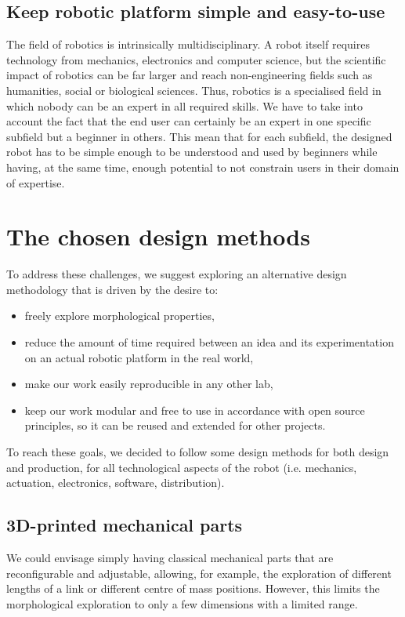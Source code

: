 \subsection{Keep robotic platform simple and easy-to-use} %

The field of robotics is intrinsically multidisciplinary. A robot itself requires technology from mechanics, electronics and computer science, but the scientific impact of robotics can be far larger and reach non-engineering fields such as humanities, social or biological sciences. Thus, robotics is a specialised field  in which nobody can be an expert in all required skills.
We have to take into account the fact that the end user can certainly be an expert in one specific subfield but a beginner in others. This mean that for each subfield, the designed robot has to be simple enough to be understood and used by beginners while having, at the same time, enough potential to not constrain users in their domain of expertise.



\section{The chosen design methods} %

To address these challenges, we suggest exploring an alternative design methodology that is driven by the desire to:
\begin{itemize}
    \item freely explore morphological properties,
    \item reduce the amount of time required between an idea and its experimentation on an actual robotic platform in the real world,
    \item make our work easily reproducible in any other lab,
    \item keep our work modular and free to use in accordance with open source principles, so it can be reused and extended for other projects.
\end{itemize}

To reach these goals, we decided to follow some design methods for both design and production, for all technological aspects of the robot (i.e. mechanics, actuation, electronics, software, distribution).

\subsection{3D-printed mechanical parts} %
We could envisage simply having classical mechanical parts that are reconfigurable and adjustable, allowing, for example, the exploration of different lengths of a link or different centre of mass positions. However, this limits the morphological exploration to only a few dimensions with a limited range.

